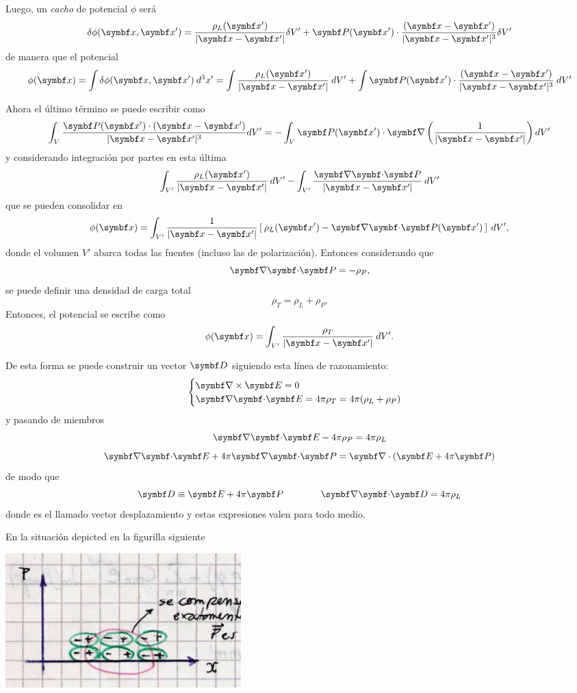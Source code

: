 \documentclass[10pt,oneside]{CBFT_book}
\begin{document}
Luego, un {\it cacho} de potencial $ \phi $ será
\[
	\delta \phi(\vbx,\vbx') = \frac{\rho_L(\vbx')}{|\vbx - \vbx'|} \delta V' +
	\vb{P}(\vbx')\cdot\frac{(\vbx - \vbx')}{|\vbx - \vbx'|^3} \delta V'
\]
de manera que el potencial
\[
	\phi(\vbx) = \int \delta \phi(\vbx,\vbx') \: d^3x' =
	\int \frac{\rho_L(\vbx')}{|\vbx - \vbx'|} \: dV' +
	\int \vb{P}(\vbx')\cdot\frac{(\vbx - \vbx')}{|\vbx - \vbx'|^3} \: dV'
\]

Ahora el último término se puede escribir como
\[
	\int_V \frac{\vb{P}(\vbx')\cdot ( \vbx - \vbx')}{|\vb{x}-\vb{x}'|^3} dV' =
	-\int_V \vb{P}(\vbx')\cdot \Nabla\left( \frac{ 1 }{ |\vb{x}-\vb{x}'| } \right) dV' 
\]
y considerando integración por partes en esta última 
\[
	\int_{V'} \frac{\rho_L(\vbx')}{|\vb{x}-\vb{x}'|} \: dV' -
	\int_{V'} \frac{ \divem{P} }{|\vb{x}-\vb{x}'|} \: dV' 
\]
que se pueden consolidar en
\[
	\phi(\vbx ) = \int_{V'} \frac{1}{|\vb{x}-\vb{x}'|}
	\left[ \: \rho_L(\vbx') - \divem{P}(\vbx') \:\right] \: dV',
\]
donde el volumen $V'$ abarca todas las fuentes (incluso las de polarización). Entonces
considerando que
\[
	\divem{P} = -\rho_P,
\]
se puede definir una densidad de carga total 
\[
	\rho_T = \rho_L + \rho_P.
\]
Entonces, el potencial se escribe como
\[
	\phi(\vbx ) = \int_{V'} \frac{\rho_T}{|\vb{x}-\vb{x}'|} \: dV'.
\]

De esta forma se puede construir un vector $\vb{D}$ siguiendo
esta línea de razonamiento:
\[
	\begin{cases}
	\rotorm{E}  = 0 \\
	\divem{E} = 4\pi\rho_T = 4 \pi ( \rho_L + \rho_P )
	\end{cases}
\]
y pasando de miembros
\[
	\divem{E} -  4 \pi \rho_P = 4 \pi \rho_L 
\]
\[
	\divem{E} + 4 \pi \divem{P} = \Nabla\cdot(\vb{E} + 4\pi\vb{P} )
\]
de modo que
\[
	\vb{D} \equiv \vb{E} + 4 \pi \vb{P} \qquad \qquad \divem{D} = 4\pi\rho_L
\]
donde  es el llamado vector desplazamiento y estas expresiones valen para todo medio.

En la situación depicted en la figurilla siguiente

\includegraphics[width=0.4\textwidth]{images/fig_ft1_rhoP_nocompensada.jpg}
\end{document}
